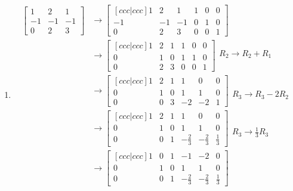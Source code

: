 \documentclass[11pt]{article}
\begin{document}
\begin{enumerate}[ (a) ]
\item
\begin{align*}
\begin{bmatrix}
1 & 2 & 1 \\
-1 & -1 & -1\\
0 & 2 & 3
\end{bmatrix}
&\rightarrow
\begin{bmatrix}[ccc|ccc]
1 & 2 & 1 & 1 & 0 & 0\\
-1 & -1 & -1 & 0 & 1 & 0\\
0 & 2 & 3 & 0 & 0 & 1
\end{bmatrix} \\
&\rightarrow
\begin{bmatrix}[ccc|ccc]
1 & 2 & 1 & 1 & 0 & 0\\
0 & 1 & 0 & 1 & 1 & 0\\
0 & 2 & 3 & 0 & 0 & 1
\end{bmatrix}
\begin{matrix}
\\
R_2 \rightarrow R_2 + R_1 \\
\\
\end{matrix} \\
&\rightarrow
\begin{bmatrix}[ccc|ccc]
1 & 2 & 1 & 1 & 0 & 0\\
0 & 1 & 0 & 1 & 1 & 0\\
0 & 0 & 3 & -2 & -2 & 1
\end{bmatrix}
\begin{matrix}
\\
\\
R_3 \rightarrow R_3 - 2R_2
\end{matrix} \\
&\rightarrow
\begin{bmatrix}[ccc|ccc]
1 & 2 & 1 & 1 & 0 & 0\\
0 & 1 & 0 & 1 & 1 & 0\\
0 & 0 & 1 & -\frac{2}{3} & -\frac{2}{3} & \frac{1}{3}
\end{bmatrix}
\begin{matrix}
\\
\\
R_3 \rightarrow \frac{1}{3}R_3
\end{matrix} \\
&\rightarrow
\begin{bmatrix}[ccc|ccc]
1 & 0 & 1 & -1 & -2 & 0\\
0 & 1 & 0 & 1 & 1 & 0\\
0 & 0 & 1 & -\frac{2}{3} & -\frac{2}{3} & \frac{1}{3}

\end{bmatrix}
\end{align*}
\end{enumerate}
\end{document}
